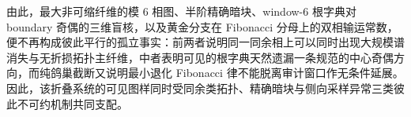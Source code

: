 \noindent
由此，最大非可缩纤维的模 \(6\) 相图、半阶精确暗块、window-\(6\) 根字典对 boundary 奇偶的三维盲核，以及黄金分支在 Fibonacci 分母上的双相输运常数，便不再构成彼此平行的孤立事实：前两者说明同一同余相上可以同时出现大规模谱消失与无折损拓扑主纤维，中者表明可见的根字典天然遗漏一条规范的中心奇偶方向，而纯鸽巢截断又说明最小退化 Fibonacci 律不能脱离审计窗口作无条件延展。因此，该折叠系统的可见图样同时受同余类拓扑、精确暗块与侧向采样异常三类彼此不可约机制共同支配。

\endinput
